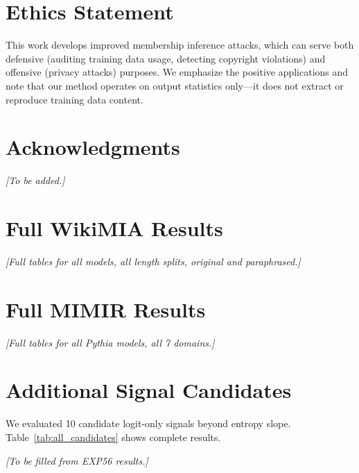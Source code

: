 \documentclass[11pt]{article}
\begin{document}
\section*{Ethics Statement}

This work develops improved membership inference attacks, which can serve both defensive (auditing training data usage, detecting copyright violations) and offensive (privacy attacks) purposes.
We emphasize the positive applications and note that our method operates on output statistics only---it does not extract or reproduce training data content.

\section*{Acknowledgments}

\textit{[To be added.]}



\appendix

\section{Full WikiMIA Results}
\label{sec:appendix_wikimia}

\textit{[Full tables for all models, all length splits, original and paraphrased.]}

\section{Full MIMIR Results}
\label{sec:appendix_mimir}

\textit{[Full tables for all Pythia models, all 7 domains.]}

\section{Additional Signal Candidates}
\label{sec:appendix_signals}

We evaluated 10 candidate logit-only signals beyond entropy slope. Table~\ref{tab:all_candidates} shows complete results.

\textit{[To be filled from EXP56 results.]}
\end{document}
